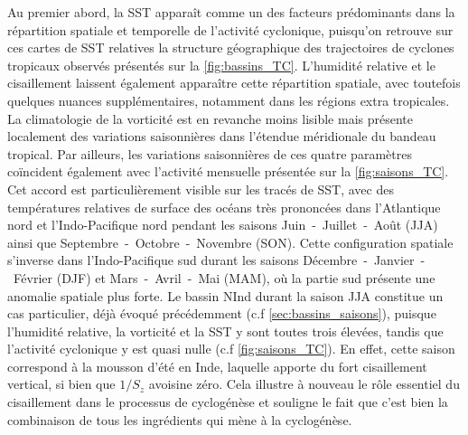 \documentclass[../main.tex]{subfiles}
\begin{document}
Au premier abord, la SST apparaît comme un des facteurs prédominants dans la répartition spatiale et temporelle de l'activité cyclonique, puisqu'on retrouve sur
ces cartes de SST relatives la structure géographique des trajectoires de cyclones tropicaux observés présentés sur la \cref{fig:bassins_TC}. L'humidité
relative et le cisaillement laissent également apparaître cette répartition spatiale, avec toutefois quelques nuances supplémentaires, notamment dans les
régions extra tropicales. La climatologie de la vorticité est en revanche moins lisible mais présente localement des variations saisonnières dans l'étendue
méridionale du bandeau tropical. Par ailleurs, les variations saisonnières de ces quatre paramètres coïncident également avec l'activité mensuelle présentée sur
la \cref{fig:saisons_TC}. Cet accord est particulièrement visible sur les tracés de SST, avec des températures relatives de surface des océans très prononcées
dans l'Atlantique nord et l'Indo-Pacifique nord pendant les saisons Juin~-~Juillet~-~Août (JJA) ainsi que
Septembre~-~Octobre~-~Novembre (SON). Cette configuration spatiale s'inverse dans l'Indo-Pacifique sud durant les saisons Décembre~-~Janvier~-~Février (DJF) et
Mars~-~Avril~-~Mai (MAM), où la partie sud présente une anomalie spatiale plus forte. Le bassin NInd durant la saison JJA constitue un cas particulier, déjà
évoqué précédemment (c.f \cref{sec:bassins_saisons}), puisque l'humidité relative, la vorticité et la SST y sont toutes trois élevées, tandis que l'activité
cyclonique y est quasi nulle (c.f \cref{fig:saisons_TC}). En effet, cette saison correspond à la mousson d'été en Inde, laquelle apporte du fort cisaillement
vertical, si bien que $1/S_z$ avoisine zéro. Cela illustre à nouveau le rôle essentiel du cisaillement dans le processus de cyclogénèse et
souligne le fait que c'est bien la combinaison de tous les ingrédients qui mène à la cyclogénèse.
\end{document}
